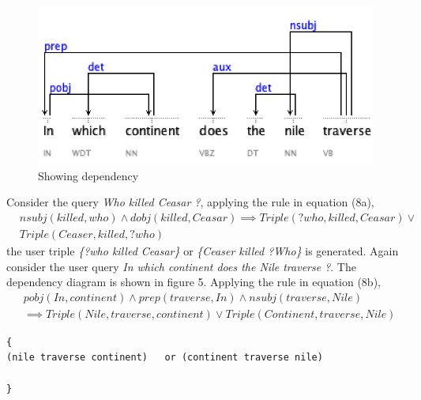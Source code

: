 \documentclass[review]{elsarticle}
\begin{document}
\begin{figure}[h]
	\centering
		\includegraphics[scale=0.7,angle=0]{nile.png}
		\caption{Showing dependency }
	\label{fig:example2}
\end{figure}
Consider the query \textit{Who killed Ceasar ?}, applying the rule in equation (8a),
\begin{equation*}
\begin{split}
&nsubj(killed,who)\land dobj(killed,Ceasar)
\implies Triple( ?who,killed,Ceasar)\lor\\
&Triple( Ceaser,killed,?who)
\end{split}
\end{equation*}
the user triple \textit{\{?who killed Ceasar\}} or \textit{\{Ceaser  killed ?Who\}}  is generated. Again consider the user query  \textit{ In which continent does the Nile traverse ?}. The dependency diagram is shown in figure 5. Applying the rule in equation (8b),
\begin{equation*}
\begin{split}
&pobj(In,continent)\land prep(traverse,In)\land nsubj(traverse,Nile)\\
&\implies Triple( Nile,traverse,continent)\lor Triple( Continent,traverse,Nile)
\end{split}
\end{equation*}
 
\begin{lstlisting}[caption= Sample user triples]
{
(nile traverse continent)   or (continent traverse nile)
         
}

\end{lstlisting}
\end{document}
